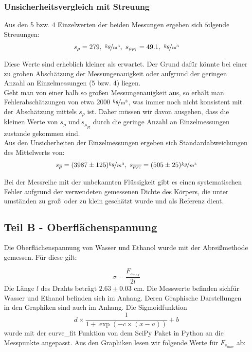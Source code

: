 \documentclass[11pt,a4paper]{article}
\begin{document}
\subsubsection{Unsicherheitsvergleich mit Streuung}

Aus den 5 bzw. 4 Einzelwerten der beiden Messungen ergeben sich folgende Streuungen:\\

$$s_\rho=279,\ \mathrm{\nicefrac{kg}{m^3}},\ s_{\rho_{Fl}}=49.1,\ \mathrm{\nicefrac{kg}{m^3}}$$

Diese Werte sind erheblich kleiner als erwartet. Der Grund daf\"ur k\"onnte bei einer zu groben Absch\"atzung der Messungenauigkeit oder aufgrund der geringen Anzahl an Einzelmessungen (5 bzw. 4) liegen.\\

Geht man von einer halb so gro\ss en Messungenauigkeit aus, so erh\"alt man Fehlerabsch\"atzungen von etwa 2000 $\mathrm{\nicefrac{kg}{m^3}}$, was immer noch nicht konsistent mit der Absch\"atzung mittels $s_\rho$ ist. Daher m\"ussen wir davon ausgehen, dass die kleinen Werte von $s_\rho\textrm{ und}\ s_{\rho_{Fl}}$ durch die geringe Anzahl an Einzelmessungen zustande gekommen sind.\\

Aus den Unsicherheiten der Einzelmessungen ergeben sich Standardabweichungen des Mittelwerts von:\\
\[
s_{\overline{\rho}}=(3987\pm125)\nicefrac{kg}{m^3},\ 
s_{\overline{\rho_{Fl}}}=(505\pm25)\nicefrac{kg}{m^3}
\]

Bei der Messreihe mit der unbekannten Fl\"ussigkeit gibt es einen systematischen Fehler aufgrund der verwendeten gemessenen Dichte des K\"orpers, die unter umst\"anden zu gro\ss\ oder zu klein gesch\"atzt wurde und als Referenz dient.

\subsection{Teil B - Oberfl\"achenspannung}

Die Oberfl\"achenspannung von Wasser und Ethanol wurde mit der Abrei\ss methode gemessen. F\"ur diese gilt:

\begin{equation}
\sigma=\frac{F_{s_{max}}}{2l}\label{eqo}
\end{equation}
Die L\"ange $l$ des Drahts betr\"agt $2.63\pm0.03$ cm. Die Messwerte befinden sichf\"ur Wasser und Ethanol befinden sich im Anhang. Deren Graphische Darstellungen in den Graphiken sind auch im Anhang. Die Sigmoidfunktion 
\begin{equation}
d\times\frac{1}{1+\exp(-c\times(x-a))}+b
\end{equation} 
wurde mit der curve\_fit Funktion von dem SciPy Paket in Python an die Messpunkte angepasst. Aus den Graphiken lesen wir folgende Werte f\"ur $F_{s_{max}}$ ab:
\end{document}
